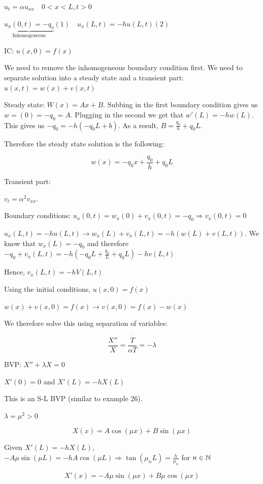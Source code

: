 \documentclass{article}
\begin{document}
$u_t = \alpha u_{xx} \quad 0 < x < L, t > 0$

$\underbrace{u_x(0,t) = - q_o}_{\text{Inhomogeneous}} (1) \quad u_x(L,t) = -h u(L,t) (2)$

IC: $u(x,0) = f(x)$

We need to remove the inhomogeneous boundary condition first. We need to separate solution into a steady state and a transient part: $u(x,t) = w(x) + v(x,t)$

\hfill

Steady state: $W(x) = Ax + B$. Subbing in the first boundary condition gives us $w=(0) = -q_0 = A$. Plugging in the second we get that $w'(L) = -h w(L)$. This gives us $- q_0 = -h (- q_0 L + b)$. As a result, $B = \frac{q_0}{h} + q_0 L$.

Therefore the steady state solution is the following:

$$w(x) = - q_0 x + \frac{q_0}{h} + q_0 L$$

\hfill

Transient part:

$v_t = \alpha^2 v_{xx}$. 

Boundary conditions: $u_x (0,t) = w_x(0) + v_x(0,t) = - q_0 \Rightarrow v_x(0,t) = 0$

$u_x(L,t) = - h u(L,t) \longrightarrow w_x(L) + v_x(L,t) = - h (w(L) + v(L,t))$. We know that $w_x(L) = - q_0$ and therefore $- q_0 + v_x(L,t) = - h \left( - q_0 L + \frac{q_0}{L} + q_0 L \right) - h v(L,t)$

Hence, $v_x(L,t) = - h V (L,t)$

Using the initial conditions, $u(x,0) = f(x)$

$w(x) + v(x,0) = f(x) \longrightarrow v(x,0) = f(x) - w(x)$

We therefore solve this using separation of variables:

$$\frac{X''}{X} = \frac{\dot{T}}{\alpha T} = - \lambda$$

BVP: $X'' + \lambda X = 0$

$X'(0) = 0$ and $X'(L) = - h X(L)$

This is an S-L BVP (similar to example 26). 

$\lambda = \mu^2 > 0$

$$X(x) = A \cos(\mu x) + B \sin(\mu x)$$

Given $X'(L) = -h X(L)$, $- A \mu \sin(\mu L) = - h A \cos(\mu L) \Rightarrow \tan(\mu_n L) = \frac{h}{\mu_n}$ for $n \in \mathbb{N}$

$$X'(x) = -A \mu \sin(\mu x) + B \mu \cos(\mu x)$$
\end{document}
